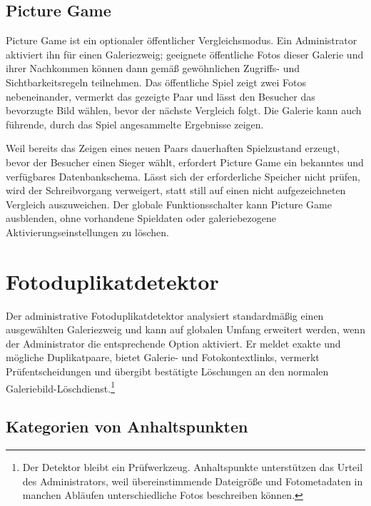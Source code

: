 \documentclass[11pt,a4paper]{article}
\begin{document}
\subsection{Picture Game}

Picture Game ist ein optionaler öffentlicher Vergleichsmodus. Ein Administrator
aktiviert ihn für einen Galeriezweig; geeignete öffentliche Fotos dieser Galerie
und ihrer Nachkommen können dann gemäß gewöhnlichen Zugriffs- und
Sichtbarkeitsregeln teilnehmen. Das öffentliche Spiel zeigt zwei Fotos
nebeneinander, vermerkt das gezeigte Paar und lässt den Besucher das bevorzugte
Bild wählen, bevor der nächste Vergleich folgt. Die Galerie kann auch führende,
durch das Spiel angesammelte Ergebnisse zeigen.

Weil bereits das Zeigen eines neuen Paars dauerhaften Spielzustand erzeugt,
bevor der Besucher einen Sieger wählt, erfordert Picture Game ein bekanntes und
verfügbares Datenbankschema. Lässt sich der erforderliche Speicher nicht prüfen,
wird der Schreibvorgang verweigert, statt still auf einen nicht aufgezeichneten
Vergleich auszuweichen. Der globale Funktionsschalter kann Picture Game
ausblenden, ohne vorhandene Spieldaten oder galeriebezogene
Aktivierungseinstellungen zu löschen.

\section{Fotoduplikatdetektor}
\label{sec:duplicates}

Der administrative Fotoduplikatdetektor analysiert standardmäßig einen
ausgewählten Galeriezweig und kann auf globalen Umfang erweitert werden, wenn
der Administrator die entsprechende Option aktiviert. Er meldet exakte und
mögliche Duplikatpaare, bietet Galerie- und Fotokontextlinks, vermerkt
Prüfentscheidungen und übergibt bestätigte Löschungen an den normalen
Galeriebild-Löschdienst.\footnote{Der Detektor bleibt ein Prüfwerkzeug.
Anhaltspunkte unterstützen das Urteil des Administrators, weil übereinstimmende
Dateigröße und Fotometadaten in manchen Abläufen unterschiedliche Fotos
beschreiben können.}

\subsection{Kategorien von Anhaltspunkten}
\end{document}
